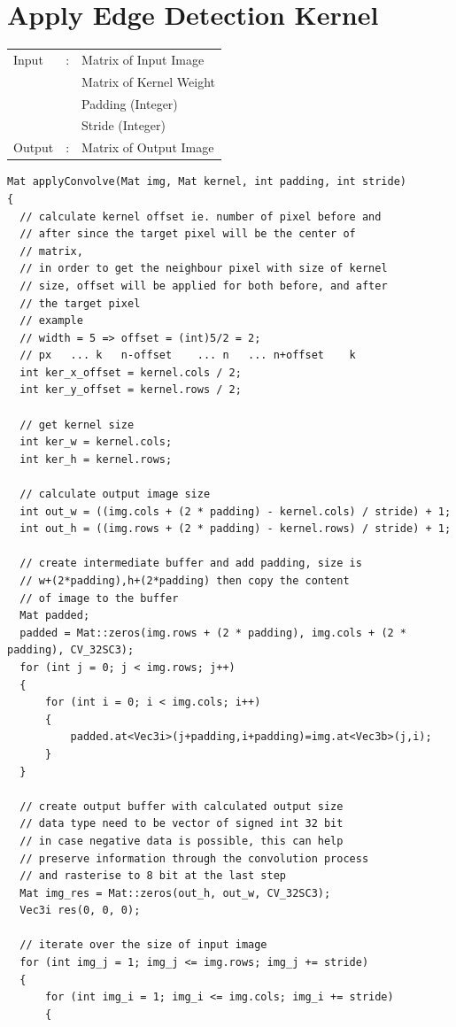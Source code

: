 \documentclass[12pt,a4paper]{report}
\begin{document}
\section{Apply Edge Detection Kernel}
\begin{tabular}{lll}
  Input  & : & Matrix of Input Image   \\
         &   & Matrix of Kernel Weight \\
         &   & Padding (Integer)       \\
         &   & Stride (Integer)        \\
  Output & : & Matrix of Output Image  \\
\end{tabular}
\begin{lstlisting}
Mat applyConvolve(Mat img, Mat kernel, int padding, int stride)
{
  // calculate kernel offset ie. number of pixel before and 
  // after since the target pixel will be the center of 
  // matrix,
  // in order to get the neighbour pixel with size of kernel
  // size, offset will be applied for both before, and after
  // the target pixel
  // example
  // width = 5 => offset = (int)5/2 = 2;
  // px   ... k   n-offset    ... n   ... n+offset    k
  int ker_x_offset = kernel.cols / 2;
  int ker_y_offset = kernel.rows / 2;

  // get kernel size
  int ker_w = kernel.cols;
  int ker_h = kernel.rows;

  // calculate output image size
  int out_w = ((img.cols + (2 * padding) - kernel.cols) / stride) + 1;
  int out_h = ((img.rows + (2 * padding) - kernel.rows) / stride) + 1;

  // create intermediate buffer and add padding, size is 
  // w+(2*padding),h+(2*padding) then copy the content 
  // of image to the buffer
  Mat padded;
  padded = Mat::zeros(img.rows + (2 * padding), img.cols + (2 * padding), CV_32SC3);
  for (int j = 0; j < img.rows; j++)
  {
      for (int i = 0; i < img.cols; i++)
      {
          padded.at<Vec3i>(j+padding,i+padding)=img.at<Vec3b>(j,i);
      }
  }
  
  // create output buffer with calculated output size
  // data type need to be vector of signed int 32 bit
  // in case negative data is possible, this can help
  // preserve information through the convolution process
  // and rasterise to 8 bit at the last step
  Mat img_res = Mat::zeros(out_h, out_w, CV_32SC3);
  Vec3i res(0, 0, 0);

  // iterate over the size of input image
  for (int img_j = 1; img_j <= img.rows; img_j += stride)
  {
      for (int img_i = 1; img_i <= img.cols; img_i += stride)
      {


\end{lstlisting}
\end{document}
